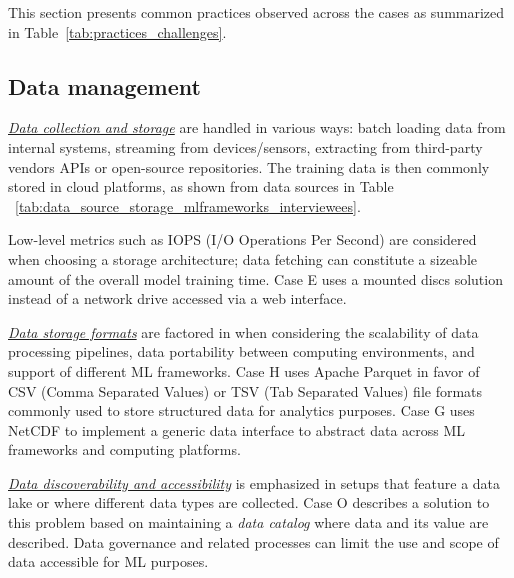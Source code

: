
This section presents common practices observed across the cases as summarized in Table~\ref{tab:practices_challenges}.

\subsection{Data management}

\underline{\emph{Data collection and storage}}
are handled in various ways: batch loading data from internal systems, streaming from devices/sensors, extracting from third-party vendors APIs or open-source repositories. The training data is then commonly stored in cloud platforms, as shown from data sources in Table ~\ref{tab:data_source_storage_mlframeworks_interviewees}.

Low-level metrics such as IOPS (I/O Operations Per Second) are considered when choosing a storage architecture; data fetching can constitute a sizeable amount of the overall model training time. Case E uses a mounted discs solution instead of a network drive accessed via a web interface. %

\underline{\emph{Data storage formats}} are factored in when considering the scalability of data processing pipelines, data portability between computing environments, and support of different ML frameworks. Case H uses Apache Parquet in favor of CSV (Comma Separated Values) or TSV (Tab Separated Values) file formats commonly used to store structured data for analytics purposes. Case G uses NetCDF to implement a generic data interface to abstract data across ML frameworks and computing platforms. 


\underline{\emph{Data discoverability and accessibility}}
is emphasized in setups that feature a data lake or where different data types are collected. Case O describes a solution to this problem based on maintaining a \textit{data catalog} where data and its value are described. %
Data governance and related processes can limit the use and scope of data accessible for ML purposes.

